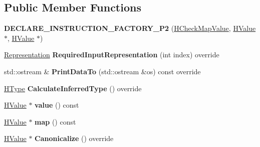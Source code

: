 \subsection*{Public Member Functions}
\begin{DoxyCompactItemize}
\item 
{\bfseries D\+E\+C\+L\+A\+R\+E\+\_\+\+I\+N\+S\+T\+R\+U\+C\+T\+I\+O\+N\+\_\+\+F\+A\+C\+T\+O\+R\+Y\+\_\+\+P2} (\hyperlink{classv8_1_1internal_1_1_h_check_map_value}{H\+Check\+Map\+Value}, \hyperlink{classv8_1_1internal_1_1_h_value}{H\+Value} $\ast$, \hyperlink{classv8_1_1internal_1_1_h_value}{H\+Value} $\ast$)\hypertarget{classv8_1_1internal_1_1_h_check_map_value_aaaeacdb962a7a70d8af27837f9621261}{}\label{classv8_1_1internal_1_1_h_check_map_value_aaaeacdb962a7a70d8af27837f9621261}

\item 
\hyperlink{classv8_1_1internal_1_1_representation}{Representation} {\bfseries Required\+Input\+Representation} (int index) override\hypertarget{classv8_1_1internal_1_1_h_check_map_value_a15dec831d1fe376f99b4697a5f7c11d6}{}\label{classv8_1_1internal_1_1_h_check_map_value_a15dec831d1fe376f99b4697a5f7c11d6}

\item 
std\+::ostream \& {\bfseries Print\+Data\+To} (std\+::ostream \&os) const  override\hypertarget{classv8_1_1internal_1_1_h_check_map_value_a7d93b35d9c62e3f522e477156a21c155}{}\label{classv8_1_1internal_1_1_h_check_map_value_a7d93b35d9c62e3f522e477156a21c155}

\item 
\hyperlink{classv8_1_1internal_1_1_h_type}{H\+Type} {\bfseries Calculate\+Inferred\+Type} () override\hypertarget{classv8_1_1internal_1_1_h_check_map_value_a04e7cde74cb0219b8a34dc56f895944f}{}\label{classv8_1_1internal_1_1_h_check_map_value_a04e7cde74cb0219b8a34dc56f895944f}

\item 
\hyperlink{classv8_1_1internal_1_1_h_value}{H\+Value} $\ast$ {\bfseries value} () const \hypertarget{classv8_1_1internal_1_1_h_check_map_value_ab7cd949772e27743104c998ad46477e2}{}\label{classv8_1_1internal_1_1_h_check_map_value_ab7cd949772e27743104c998ad46477e2}

\item 
\hyperlink{classv8_1_1internal_1_1_h_value}{H\+Value} $\ast$ {\bfseries map} () const \hypertarget{classv8_1_1internal_1_1_h_check_map_value_a1fcc10ec5bd39322410903a86e634dfc}{}\label{classv8_1_1internal_1_1_h_check_map_value_a1fcc10ec5bd39322410903a86e634dfc}

\item 
\hyperlink{classv8_1_1internal_1_1_h_value}{H\+Value} $\ast$ {\bfseries Canonicalize} () override\hypertarget{classv8_1_1internal_1_1_h_check_map_value_a54407d7d053959df8745ac7581b2313b}{}\label{classv8_1_1internal_1_1_h_check_map_value_a54407d7d053959df8745ac7581b2313b}

\end{DoxyCompactItemize}
